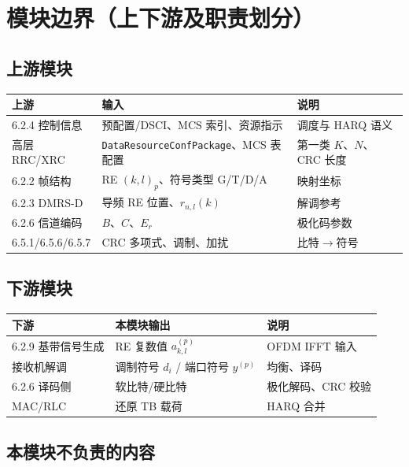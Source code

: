 \documentclass[11pt,a4paper]{ctexart}
\begin{document}
\section{模块边界（上下游及职责划分）}

\subsection{上游模块}

\begin{table}[h]
\centering
\small
\begin{tabular}{p{4cm}p{4.5cm}p{5.5cm}}
\toprule
\textbf{上游} & \textbf{输入} & \textbf{说明} \\
\midrule
6.2.4 控制信息 & 预配置/DSCI、MCS 索引、资源指示 & 调度与 HARQ 语义 \\
高层 RRC/XRC & \texttt{DataResourceConfPackage}、MCS 表配置 & 第一类 $K$、$N$、CRC 长度 \\
6.2.2 帧结构 & RE $(k,l)_p$、符号类型 G/T/D/A & 映射坐标 \\
6.2.3 DMRS-D & 导频 RE 位置、$r_{n,l}(k)$ & 解调参考 \\
6.2.6 信道编码 & $B$、$C$、$E_r$ & 极化码参数 \\
6.5.1/6.5.6/6.5.7 & CRC 多项式、调制、加扰 & 比特$\rightarrow$符号 \\
\bottomrule
\end{tabular}
\end{table}

\subsection{下游模块}

\begin{table}[h]
\centering
\small
\begin{tabular}{p{4cm}p{4.5cm}p{5.5cm}}
\toprule
\textbf{下游} & \textbf{本模块输出} & \textbf{说明} \\
\midrule
6.2.9 基带信号生成 & RE 复数值 $a_{k,l}^{(p)}$ & OFDM IFFT 输入 \\
接收机解调 & 调制符号 $d_i$ / 端口符号 $y^{(p)}$ & 均衡、译码 \\
6.2.6 译码侧 & 软比特/硬比特 & 极化解码、CRC 校验 \\
MAC/RLC & 还原 TB 载荷 & HARQ 合并 \\
\bottomrule
\end{tabular}
\end{table}

\subsection{本模块不负责的内容}
\end{document}
